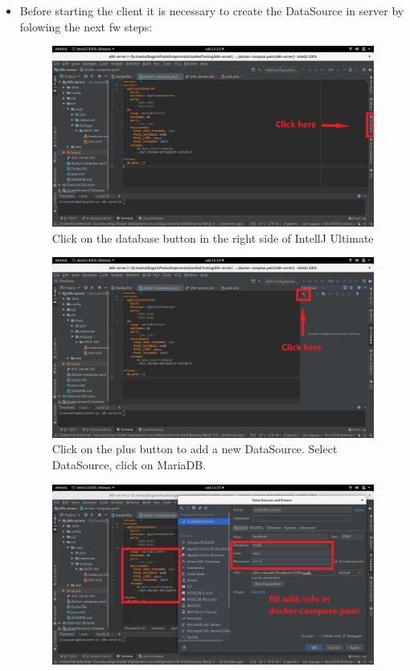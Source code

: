\begin{itemize}
	\item Before starting the client it is necessary to create the DataSource in server by folowing the next fw steps:
	\begin{figure}[h!]
		\centering
		\includegraphics[width=1.0\textwidth]{./pictures/first_step.png}\par
		\caption{Click on the database button in the right side of IntellJ Ultimate}
	\end{figure}
	\FloatBarrier
	\begin{figure}[h!]
		\centering
		\includegraphics[width=1.0\textwidth]{./pictures/second_step.png}\par
		\caption{Click on the plus button to add a new DataSource. Select DataSource, click on MariaDB. }
	\end{figure}
	\FloatBarrier
	\begin{figure}[h!]
		\centering
		\includegraphics[width=1.0\textwidth]{./pictures/third_step.png}\par

\end{figure}
\end{itemize}
